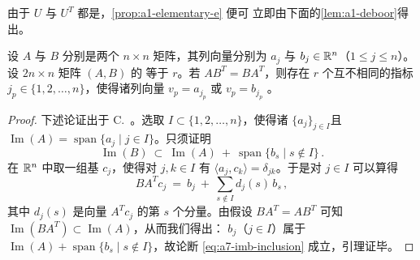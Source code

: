 由于 $U$ 与 $U^{T}$ 都是\trSymplecticMatrix{}，\cref{prop:a1-elementary-e} 便可%
立即由下面的\cref{lem:a1-deboor}得出。

\begin{lemma}\label{lem:a1-deboor}
设 $A$ 与 $B$ 分别是两个 $n\times n$ 矩阵，其列向量分别为 $a_{j}$ 与%
 $b_{j}\in\mathbb{R}^{n}$（$1\leq j\leq n$）。设 $2n\times n$ 矩阵 $(A,B)$ 的\trRank{}%
等于 $r$。若 $AB^{T}=BA^{T}$，则存在 $r$ 个互不相同的指标%
 $j_{p}\in\{1,2,\ldots,n\}$，使得诸列向量 $v_{p}=a_{j_{p}}$ 或%
 $v_{p}=b_{j_{p}}$ \trLinearlyIndependent。
\end{lemma}

\begin{proof}
下述论证出于 C.~\trDeBoor{}。选取 $I\subset\{1,2,\ldots,n\}$，使得诸%
 $\{a_{j}\}_{j\in I}$\trLinearlyIndependent{}且%
 $\operatorname{Im}(A)=\operatorname{span}\{a_{j}\mid j\in I\}$。只须证明
\begin{equation}\label{eq:a7-imb-inclusion}
\operatorname{Im}(B)\ \subset\ \operatorname{Im}(A)\ +\ \operatorname{span}\{b_{s}\mid s\notin I\}\,.
\end{equation}
在 $\mathbb{R}^{n}$ 中取一组基 $c_{j}$，使得对 $j,k\in I$ 有%
 $\langle a_{j},c_{k}\rangle=\delta_{jk}$。于是对 $j\in I$ 可以算得
\[
BA^{T}c_{j}\ =\ b_{j}\ +\ \sum_{s\notin I}d_{j}(s)\,b_{s}\,,
\]
其中 $d_{j}(s)$ 是向量 $A^{T}c_{j}$ 的第 $s$ 个分量。由假设 $BA^{T}=AB^{T}$ %
可知 $\operatorname{Im}(BA^{T})\subset\operatorname{Im}(A)$，从而我们得出：%
$b_{j}$（$j\in I$）属于 $\operatorname{Im}(A)+\operatorname{span}\{b_{s}\mid s\notin I\}$，故论断 \eqref{eq:a7-imb-inclusion} 成立，引理证毕。
\end{proof}

